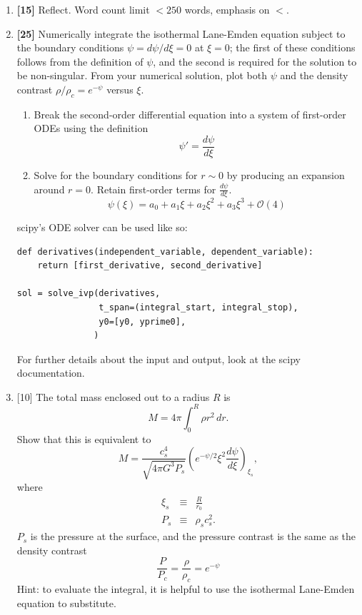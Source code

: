 \documentclass{article}
\begin{document}
\begin{enumerate}
\item \textbf{[15]} Reflect.  Word count limit $<250$ words, emphasis on $<$.

\item \textbf{[25]} Numerically integrate the isothermal Lane-Emden equation subject to the
    boundary conditions $\psi=d\psi/d\xi = 0$ at $\xi=0$; the first of these
    conditions follows from the definition of $\psi$, and the second is
    required for the solution to be non-singular. From your numerical solution,
    plot both $\psi$ and the density contrast $\rho/\rho_c = e^{-\psi}$ versus
    $\xi$.

    \begin{enumerate}
        \item Break the second-order differential equation into a system of first-order ODEs using the definition
    $$ \psi ' = \frac{d\psi}{d\xi} $$
        \item Solve for the boundary conditions for $r\sim0$ by producing an expansion around $r=0$.
            Retain first-order terms for $\frac{d \psi}{d\xi}$.
            $$ \psi(\xi) = a_0 + a_1 \xi + a_2 \xi^2 + a_3 \xi^3 + \mathcal{O}(4)$$
    \end{enumerate}

    scipy's ODE solver can be used like so:
\begin{verbatim}
def derivatives(independent_variable, dependent_variable):
    return [first_derivative, second_derivative]

sol = solve_ivp(derivatives,
                t_span=(integral_start, integral_stop),
                y0=[y0, yprime0],
               )
\end{verbatim}

For further details about the input and output, look at the scipy documentation.



\item {[10]} The total mass enclosed out to a radius $R$ is
    \label{item:totalmass}
\begin{displaymath}
M = 4\pi \int_0^R \rho r^2 \, dr.
\end{displaymath}
Show that this is equivalent to
\begin{displaymath}
M =\frac{c_s^4}{\sqrt{4\pi G^3 P_s}} \left(e^{-\psi/2}\xi^2 \frac{d\psi}{d\xi}\right)_{\xi_s},
\end{displaymath}
where
\begin{eqnarray*}
\xi_s & \equiv & \frac{R}{r_0} \\
P_s & \equiv & \rho_s c_s^2.
\end{eqnarray*}
$P_s$ is the pressure at the surface, and the pressure contrast is the same as the density contrast $$\frac{P}{P_c} = \frac{\rho}{\rho_c} = e^{-\psi}$$
Hint: to evaluate the integral, it is helpful to use the isothermal Lane-Emden equation to substitute.


\end{enumerate}
\end{document}
